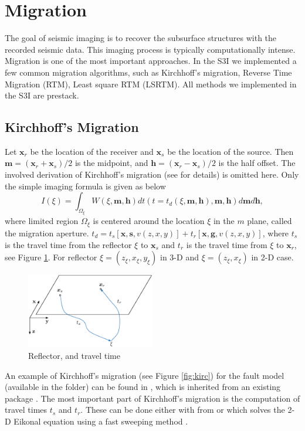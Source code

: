 \documentclass[11pt,titlepage]{article}
\newcommand{\bx}{\boldsymbol{x}}
\newcommand{\bg}{\boldsymbol{g}}
\newcommand{\bh}{\boldsymbol{h}}
\newcommand{\bs}{\boldsymbol{s}}
\newcommand{\bm}{\boldsymbol{m}}
\theoremstyle{plain}
\theoremstyle{definition}
\theoremstyle{remark}
\numberwithin{equation}{section}
\begin{document}
\section{Migration}
The goal of seismic imaging is to recover the subsurface structures with the recorded seismic data. This imaging process is typically computationally intense. Migration is one of the most important approaches. In the S3I we implemented a few common migration algorithms, such as Kirchhoff's migration, Reverse Time Migration (RTM), Least square RTM (LSRTM). All methods we implemented in the S3I are prestack.  


\subsection{Kirchhoff's Migration}
Let $\bx_r$ be the location of the receiver and $\bx_s$ be the location of the source. Then $\bm=(\bx_r+\bx_s)/2$ is the midpoint, and $\bh=(\bx_r-\bx_s)/2$ is the half offset. The involved derivation of Kirchhoff's migration (see \cite{Schneider:1978aa} for details) is omitted here. Only the simple imaging formula is given as below
\begin{equation}
\label{eq:kirchhoffImaging}
I(\xi)=\int_{\Omega_\xi} W(\xi,\bm,\bh)dt(t=t_d(\xi,
\bm,\bh),\bm,\bh)d\bm d\bh,
\end{equation}
where limited region $\Omega_\xi$ is centered around the location $\xi$ in the $m$ plane, called the migration aperture. $t_d=t_s[\bx,\bs,v(z,x,y)]+t_r[\bx,\bg,v(z,x,y)]$, where $t_s$ is the travel time from the reflector $\xi$ to $\bx_s$ and $t_r$ is the travel time from $\xi$ to $\bx_r$, see Figure \ref{fig:ref}. For reflector $\xi = (z_\xi, x_\xi, y_\xi)$ in 3-D and $\xi = (z_\xi, x_\xi)$ in 2-D case.

\begin{figure}[htbp]
\centering
\includegraphics[width=0.5\textwidth]{Fig/tstr}
\caption{Reflector, and travel time}
\label{fig:ref}
\end{figure}
  
An example of Kirchhoff's migration (see Figure \ref{fig:kirc}) for the fault model (available in the  folder) can be found in , which is inherited from an existing package \cite{Kozola:2011aa}. The most important part of Kirchhoff's migration is the computation of travel times $t_s$ and $t_r$. These can be done either with  from \cite{Kozola:2011aa} or  which solves the 2-D Eikonal equation using a fast sweeping method \cite{Zhao:2004aa}.
\end{document}
